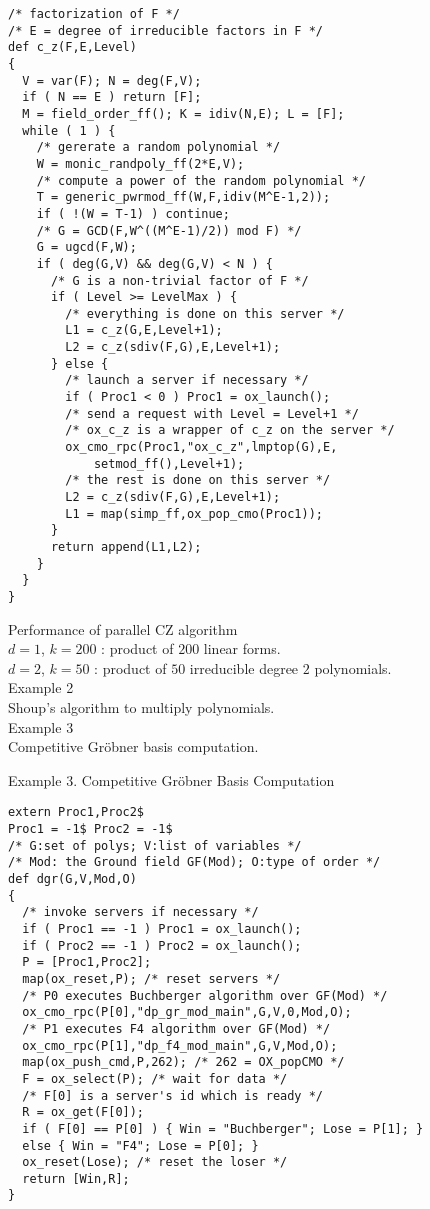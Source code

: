 \documentclass{slides}
\begin{document}
\begin{verbatim}
/* factorization of F */
/* E = degree of irreducible factors in F */
def c_z(F,E,Level)
{
  V = var(F); N = deg(F,V);
  if ( N == E ) return [F];
  M = field_order_ff(); K = idiv(N,E); L = [F];
  while ( 1 ) {
    /* gererate a random polynomial */
    W = monic_randpoly_ff(2*E,V);
    /* compute a power of the random polynomial */
    T = generic_pwrmod_ff(W,F,idiv(M^E-1,2));
    if ( !(W = T-1) ) continue;
    /* G = GCD(F,W^((M^E-1)/2)) mod F) */
    G = ugcd(F,W);
    if ( deg(G,V) && deg(G,V) < N ) {
      /* G is a non-trivial factor of F */
      if ( Level >= LevelMax ) {
        /* everything is done on this server */
        L1 = c_z(G,E,Level+1);
        L2 = c_z(sdiv(F,G),E,Level+1);
      } else {
        /* launch a server if necessary */
        if ( Proc1 < 0 ) Proc1 = ox_launch();
        /* send a request with Level = Level+1 */
        /* ox_c_z is a wrapper of c_z on the server */
        ox_cmo_rpc(Proc1,"ox_c_z",lmptop(G),E,
            setmod_ff(),Level+1);
        /* the rest is done on this server */
        L2 = c_z(sdiv(F,G),E,Level+1);
        L1 = map(simp_ff,ox_pop_cmo(Proc1));
      }
      return append(L1,L2);
    }
  }
}
\end{verbatim}
\newpage

\epsfxsize=17cm

\noindent
{\color{blue} Performance of parallel CZ algorithm} \\
$d=1$, $k=200$ : product of $200$ linear forms. \\
$d=2$, $k=50$ : product of $50$ irreducible degree $2$ polynomials. \\

\newpage
{\color{green} Example 2} \\
Shoup's algorithm to multiply polynomials.  \\
{\color{green} Example 3} \\
Competitive Gr\"obner basis computation. \\
\newpage

\noindent
{\color{green} Example 3. Competitive Gr\"obner Basis Computation}
\begin{verbatim}
extern Proc1,Proc2$
Proc1 = -1$ Proc2 = -1$
/* G:set of polys; V:list of variables */
/* Mod: the Ground field GF(Mod); O:type of order */
def dgr(G,V,Mod,O)
{
  /* invoke servers if necessary */
  if ( Proc1 == -1 ) Proc1 = ox_launch();
  if ( Proc2 == -1 ) Proc2 = ox_launch();
  P = [Proc1,Proc2];
  map(ox_reset,P); /* reset servers */
  /* P0 executes Buchberger algorithm over GF(Mod) */
  ox_cmo_rpc(P[0],"dp_gr_mod_main",G,V,0,Mod,O);
  /* P1 executes F4 algorithm over GF(Mod) */
  ox_cmo_rpc(P[1],"dp_f4_mod_main",G,V,Mod,O);
  map(ox_push_cmd,P,262); /* 262 = OX_popCMO */
  F = ox_select(P); /* wait for data */
  /* F[0] is a server's id which is ready */
  R = ox_get(F[0]);
  if ( F[0] == P[0] ) { Win = "Buchberger"; Lose = P[1]; }
  else { Win = "F4"; Lose = P[0]; }
  ox_reset(Lose); /* reset the loser */
  return [Win,R];
}
\end{verbatim}
\newpage
\end{document}
